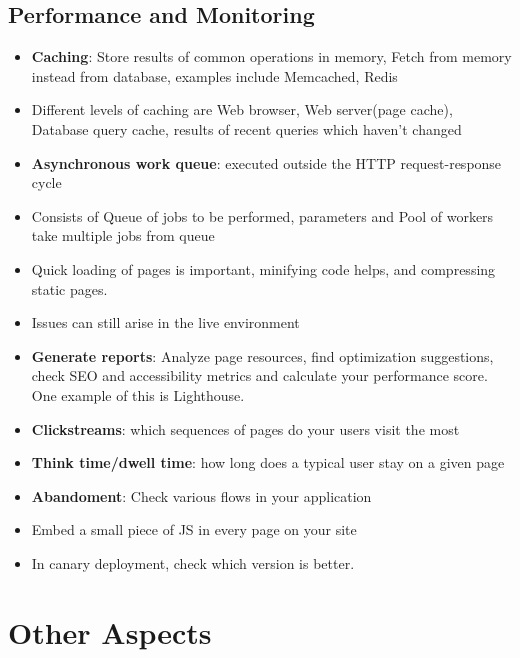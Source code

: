 \documentclass[a4paper]{article}
\begin{document}
\subsection{Performance and Monitoring}
\begin{itemize}
    \item \textbf{Caching}: Store results of common operations in memory, Fetch from memory instead from database, examples include Memcached, Redis
    \item Different levels of caching are Web browser, Web server(page cache), Database query cache, results of recent queries which haven’t changed
    \item \textbf{Asynchronous work queue}: executed outside the HTTP request-response cycle
    \item Consists of Queue of jobs to be performed, parameters and Pool of workers take multiple jobs from queue
    \item Quick loading of pages is important, minifying code helps, and compressing static pages.
    \item Issues can still arise in the live environment
    \item \textbf{Generate reports}: Analyze page resources, find optimization suggestions, check SEO and accessibility metrics and calculate your performance score. One example of this is Lighthouse.
    \item \textbf{Clickstreams}: which sequences of pages do your users visit the most
    \item \textbf{Think time/dwell time}: how long does a typical user stay on a given page
    \item \textbf{Abandoment}: Check various flows in your application
    \item Embed a small piece of JS in every page on your site
    \item In canary deployment, check which version is better.
\end{itemize}

\section{Other Aspects}
\end{document}

